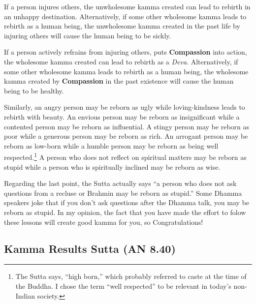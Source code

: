 If a person injures others, the unwholesome kamma created can lead to rebirth in an unhappy destination. Alternatively, if some other wholesome kamma leads to rebirth as a human being, the unwholesome kamma created in the past life by injuring others will cause the human being to be sickly. 

If a person actively refrains from injuring others, puts \textbf{Compassion} into action, the wholesome kamma created can lead to rebirth as a \textit{Deva}. Alternatively, if some other wholesome kamma leads to rebirth as a human being, the wholesome kamma created by \textbf{Compassion} in the past existence will cause the human being to be healthy.

Similarly, an angry person may be reborn as ugly while loving-kindness leads to rebirth with beauty. An envious person may be reborn as insignificant while a contented person may be reborn as influential. A stingy person may be reborn as poor while a generous person may be reborn as rich. An arrogant person may be reborn as low-born while a humble person may be reborn as being well respected.\footnote{The Sutta says, “high born,” which probably referred to caste at the time of the Buddha. I chose the term “well respected” to be relevant in today’s non-Indian society.} A person who does not reflect on spiritual matters may be reborn as stupid while a person who is spiritually inclined may be reborn as wise.

Regarding the last point, the Sutta actually says “a person who does not ask questions from a recluse or Brahmin may be reborn as stupid.” Some Dhamma speakers joke that if you don’t ask questions after the Dhamma talk, you may be reborn as stupid. In my opinion, the fact that you have made the effort to folow these lessons will create good kamma for you, so Congratulations! \smiley 

\pagebreak

\subsection*{Kamma Results Sutta (AN 8.40)}

